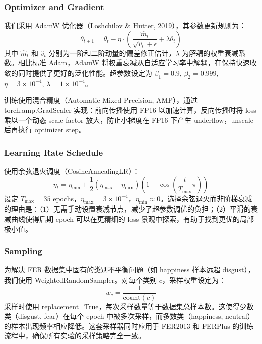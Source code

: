 \documentclass[12pt,a4paper]{article}
\begin{document}
\subsubsection{Optimizer and Gradient}

我们采用 AdamW 优化器（Loshchilov \& Hutter, 2019），其参数更新规则为：
\begin{equation}
\theta_{t+1} = \theta_t - \eta \cdot \left(\frac{\hat{m}_t}{\sqrt{\hat{v}_t} + \epsilon} + \lambda \theta_t\right)
\end{equation}
其中 $\hat{m}_t$ 和 $\hat{v}_t$ 分别为一阶和二阶动量的偏差修正估计，$\lambda$ 为解耦的权重衰减系数。相比标准 Adam，AdamW 将权重衰减从自适应学习率中解耦，在保持快速收敛的同时提供了更好的泛化性能。超参数设定为 $\beta_1=0.9$, $\beta_2=0.999$, $\eta=3\times10^{-4}$, $\lambda=1\times10^{-4}$。

训练使用混合精度（Automatic Mixed Precision, AMP），通过 torch.amp.GradScaler 实现：前向传播使用 FP16 以加速计算，反向传播时将 loss 乘以一个动态 scale factor 放大，防止小梯度在 FP16 下产生 underflow，unscale 后再执行 optimizer step。

\subsubsection{Learning Rate Schedule}

使用余弦退火调度（CosineAnnealingLR）：
\begin{equation}
\eta_t = \eta_{\min} + \frac{1}{2}(\eta_{\max} - \eta_{\min})\left(1 + \cos\left(\frac{t}{T_{\max}}\pi\right)\right)
\end{equation}
设定 $T_{\max}=35$ epochs，$\eta_{\max}=3\times10^{-4}$，$\eta_{\min}\approx 0$。选择余弦退火而非阶梯衰减的理由是：（1）无需手动设置衰减节点，减少了超参数调优的负担；（2）平滑的衰减曲线使得后期 epoch 可以在更精细的 loss 景观中探索，有助于找到更优的局部极小值。

\subsubsection{Sampling}

为解决 FER 数据集中固有的类别不平衡问题（如 happiness 样本远超 disgust），我们使用 WeightedRandomSampler。对每个类别 $c$，采样权重设定为：
\begin{equation}
w_c = \frac{1}{\text{count}(c)}
\end{equation}
采样时使用 replacement=True，每次采样数量等于数据集总样本数。这使得少数类（disgust, fear）在每个 epoch 中被多次采样，而多数类（happiness, neutral）的样本出现频率相应降低。这套采样器同时应用于 FER2013 和 FERPlus 的训练流程中，确保所有实验的采样策略完全一致。
\end{document}
